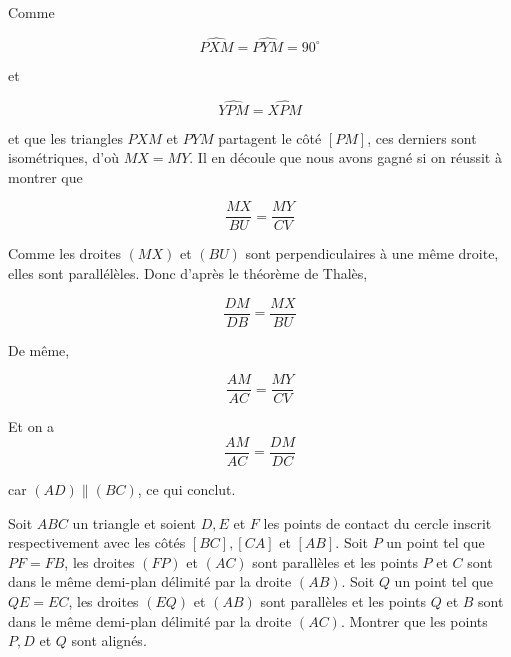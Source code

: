 \begin{sol}
Comme 

\[\widehat{PXM} = \widehat{PYM} = 90 ^ {\circ}\]

et
 
\[\widehat{YPM} =\widehat{XPM}\]

et que les triangles $PXM$ et $PYM$ partagent le côté $[PM]$, ces derniers sont isométriques, d'où $MX=MY$. Il en découle que nous avons gagné si on réussit à montrer que 

\[\frac{MX}{BU}=\frac{MY}{CV}\]

Comme les droites $(MX)$ et $(BU)$ sont perpendiculaires à une même droite, elles sont parallélèles. Donc d'après le théorème de Thalès, 

\[ \frac{DM}{DB}=\frac{MX}{BU}\]


De même, 

\[\frac{AM}{AC}=\frac{MY}{CV}\]

Et on a 
\[\frac{AM}{AC}=\frac{DM}{DC}\]

car $(AD) \parallel (BC)$, ce qui conclut.
\end{sol}

\begin{exo}
Soit $ABC$ un triangle et soient $D,E$ et $F$ les points de contact du cercle inscrit respectivement avec les côtés $[BC], [CA]$ et $[AB]$. Soit $P$ un point tel que $PF=FB$, les droites $(FP)$ et $(AC)$ sont parallèles et les points $P$ et $C$ sont dans le même demi-plan délimité par la droite $(AB)$. Soit $Q$ un point tel que $QE=EC$, les droites $(EQ)$ et $(AB)$ sont parallèles et les points $Q$ et $B$ sont dans le même demi-plan délimité par la droite $(AC)$. Montrer que les points $P, D$ et $Q$ sont alignés. 
\end{exo}

